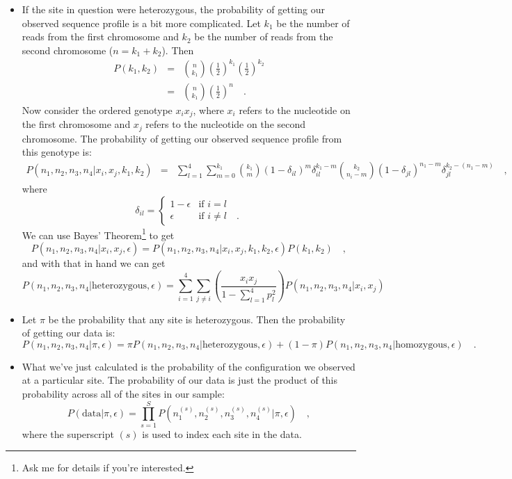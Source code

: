 \begin{itemize}
\item If the site in question were heterozygous, the probability of
  getting our observed sequence profile is a bit more complicated. Let
  $k_1$ be the number of reads from the first chromosome and $k_2$ be
  the number of reads from the second chromosome ($n=k_1+k_2$). Then
\begin{eqnarray*}
P(k_1,k_2)
&=&
{n \choose k_1}\left(\frac{1}{2}\right)^{k_1}
               \left(\frac{1}{2}\right)^{k_2}
\\
&=&
{n \choose k_1}\left(\frac{1}{2}\right)^n \quad .
\end{eqnarray*}
Now consider the ordered genotype $x_ix_j$, where $x_i$ refers to the
nucleotide on the first chromosome and $x_j$ refers to the nucleotide
on the second chromosome. The probability of getting our observed
sequence profile from this genotype is:
{\footnotesize
\begin{eqnarray*}
P(n_1,n_2,n_3,n_4|x_i,x_j,k_1,k_2)
&=&
\sum_{l=1}^4\sum_{m=0}^{k_1}{k_1 \choose m}(1-\delta_{il})^m\delta_{il}^{k_1-m}
{k_2 \choose n_i-m}(1-\delta_{jl})^{n_1-m}\delta_{jl}^{k_2-(n_1-m)}
\quad ,
\end{eqnarray*}
}
where 
\[
\delta_{il} = \left\{\begin{array}{ll}
1-\epsilon & \mbox{if } i = l \\
\epsilon & \mbox{if } i \ne l \quad .
\end{array}
\right.
\]
We can use Bayes' Theorem\footnote{Ask me for details if you're
  interested.} to get
\[
P(n_1,n_2,n_3,n_4|x_i,x_j,\epsilon) =
P(n_1,n_2,n_3,n_4|x_i,x_j,k_1,k_2,\epsilon)P(k_1,k_2) \quad ,
\]
and with that in hand we can get
\[
P(n_1,n_2,n_3,n_4|\mbox{heterozygous},\epsilon)
=
\sum_{i=1}^4\sum_{j\ne i}
\left(\frac{x_ix_j}{1-{\sum_{l=1}^4p_l^2}}\right) P(n_1,n_2,n_3,n_4|x_i,x_j) 
\]

\item Let $\pi$ be the probability that any site is heterozygous. Then
  the probability of getting our data is:
{\footnotesize
\[
P(n_1,n_2,n_3,n_4|\pi,\epsilon)
=
\pi P(n_1,n_2,n_3,n_4|\mbox{heterozygous},\epsilon)
+
(1-\pi)P(n_1,n_2,n_3,n_4|\mbox{homozygous},\epsilon) \quad .
\]
}

\item What we've just calculated is the probability of the
  configuration we observed at a particular site. The probability of
  our data is just the product of this probability across all of the
  sites in our sample:
\[
P(\mbox{data}|\pi,\epsilon) = \prod_{s=1}^S
P(n_1^{(s)},n_2^{(s)},n_3^{(s)},n_4^{(s)}|\pi,\epsilon) \quad ,
\]
where the superscript $(s)$ is used to index each site in the data.


\end{itemize}
